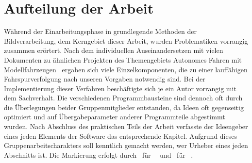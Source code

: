 \newcommand{\dcfirstauthorshort}{\framebox{K}}
\newcommand{\dcsecondauthorshort}{}
\section{Aufteilung der Arbeit \dcsecondauthorshort}
Während der Einarbeitungsphase in grundlegende Methoden der Bildverarbeitung, dem Kerngebiet dieser Arbeit, wurden Problematiken vorrangig zusammen erörtert. Nach dem individuellen Auseinandersetzen mit vielen Dokumenten zu ähnlichen Projekten des Themengebiets \glqq Autonomes Fahren mit Modellfahrzeugen \grqq\ ergaben sich viele Einzelkomponenten, die zu einer lauffähigen Fahrspurverfolgung nach unseren Vorgaben notwendig sind. Bei der Implementierung dieser Verfahren beschäftigte sich je ein Autor vorrangig mit dem Sachverhalt. Die verschiedenen Programmbausteine sind dennoch oft durch die Überlegungen beider Gruppenmitglieder entstanden, da Ideen oft gegenseitig optimiert und auf Übergabeparameter anderer Programmteile abgestimmt wurden. Nach Abschluss des praktischen Teils der Arbeit verfasste der Ideengeber eines jeden Elements der Software das entsprechende Kapitel.   
Aufgrund dieses Gruppenarbeitscharakters soll kenntlich gemacht werden, wer Urheber eines jeden Abschnitts ist. Die Markierung erfolgt durch \dcfirstauthorshort\ für \dcfirstauthorfirstname\ \dcfirstauthorlastname\  und \dcsecondauthorshort\  für \dcsecondauthorfirstname\ \dcsecondauthorlastname{}.


